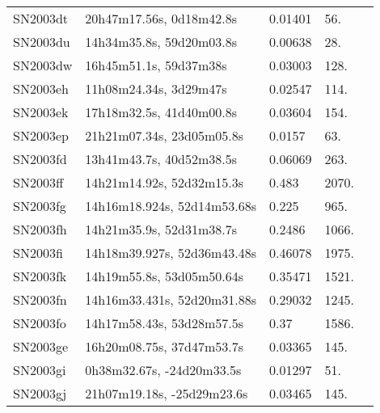 \begin{longtable}{lllll}
         SN2003dt &       20h47m17.56s, 0d18m42.8s &  0.01401 &            56. &    \citet{2014ApJ...789..112C} \\
         SN2003du &       14h34m35.8s, 59d20m03.8s &  0.00638 &            28. &    \citet{1992ApJS...81....5S} \\
         SN2003dw &         16h45m51.1s, 59d37m38s &  0.03003 &           128. &    \citet{1995ApJS..100...69F} \\
         SN2003eh &         11h08m24.34s, 3d29m47s &  0.02547 &           114. &    \citet{2004SDSS2.C...0000:} \\
         SN2003ek &       17h18m32.5s, 41d40m00.8s &  0.03604 &           154. &    \citet{1997AstL...23..638M} \\
         SN2003ep &      21h21m07.34s, 23d05m05.8s &   0.0157 &            63. &    \citet{1991RC3.9.C...0000d} \\
         SN2003fd &       13h41m43.7s, 40d52m38.5s &  0.06069 &           263. &    \citet{2016SDSSD.C...0000:} \\
         SN2003ff &      14h21m14.92s, 52d32m15.3s &    0.483 &          2070. &    \citet{2005ApJS..158..161H} \\
         SN2003fg &    14h16m18.924s, 52d14m53.68s &    0.225 &           965. &    \citet{2005ApJS..158..161H} \\
         SN2003fh &       14h21m35.9s, 52d31m38.7s &   0.2486 &          1066. &    \citet{2008ApJ...674...51E} \\
         SN2003fi &    14h18m39.927s, 52d36m43.48s &  0.46078 &          1975. &    \citet{2007DEEP2.3...0000:} \\
         SN2003fk &      14h19m55.8s, 53d05m50.64s &  0.35471 &          1521. &    \citet{2007DEEP2.3...0000:} \\
         SN2003fn &    14h16m33.431s, 52d20m31.88s &  0.29032 &          1245. &    \citet{2012DEEP2.4...0000:} \\
         SN2003fo &      14h17m58.43s, 53d28m57.5s &     0.37 &          1586. &    \citet{2003IAUC.8148C...1E} \\
         SN2003ge &      16h20m08.75s, 37d47m53.7s &  0.03365 &           145. &    \citet{2002AJ....124.1266R} \\
         SN2003gi &      0h38m32.67s, -24d20m33.5s &  0.01297 &            51. &  \citet{2006AandA...457..425C} \\
         SN2003gj &     21h07m19.18s, -25d29m23.6s &  0.03465 &           145. &    \citet{1995ApJS...96..343Q} \\

\end{longtable}

